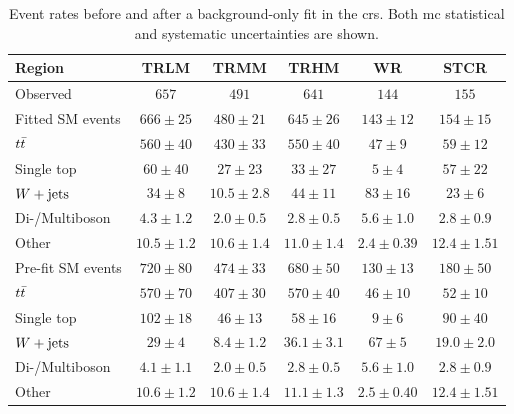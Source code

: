 \begin{table}
\begin{center}
{\small
\begin{tabular}{lccccc}
\toprule
Region           & TRLM            & TRMM            & TRHM            & WR            & STCR              \\[-0.05cm]
\midrule
Observed          & $657$              & $491$              & $641$              & $144$              & $155$                    \\
\midrule
Fitted SM events       & $666 \pm 25$          & $480 \pm 21$          & $645 \pm 26$          & $143 \pm 12$          & $154 \pm 15$              \\
\midrule
       $t\bar{t}$         & $560 \pm 40$          & $430 \pm 33$          & $550 \pm 40$          & $47 \pm 9$          & $59 \pm 12$              \\
       Single top         & $60 \pm 40$          & $27 \pm 23$          & $33 \pm 27$          & $5 \pm 4$          & $57 \pm 22$              \\
       $W+\mathrm{jets}$         & $34 \pm 8$          & $10.5 \pm 2.8$          & $44 \pm 11$          & $83 \pm 16$          & $23 \pm 6$              \\
       Di-/Multiboson         & $4.3 \pm 1.2$          & $2.0 \pm 0.5$          & $2.8 \pm 0.5$          & $5.6 \pm 1.0$          & $2.8 \pm 0.9$              \\
       Other        & $10.5 \pm 1.2$          & $10.6 \pm 1.4$          & $11.0 \pm 1.4$          & $2.4 \pm 0.39$          & $12.4 \pm 1.51$              \\
\toprule
Pre-fit SM events              & $720 \pm 80$          & $474 \pm 33$          & $680 \pm 50$          & $130 \pm 13$          & $180 \pm 50$              \\
\midrule
        $t\bar{t}$         & $570 \pm 70$          & $407 \pm 30$          & $570 \pm 40$          & $46 \pm 10$          & $52 \pm 10$              \\
        Single top         & $102 \pm 18$          & $46 \pm 13$          & $58 \pm 16$          & $9 \pm 6$          & $90 \pm 40$              \\
        $W+\mathrm{jets}$        & $29 \pm 4$          & $8.4 \pm 1.2$          & $36.1 \pm 3.1$          & $67 \pm 5$          & $19.0 \pm 2.0$              \\
        Di-/Multiboson         & $4.1 \pm 1.1$          & $2.0 \pm 0.5$          & $2.8 \pm 0.5$          & $5.6 \pm 1.0$          & $2.8 \pm 0.9$              \\
        Other         & $10.6 \pm 1.2$          & $10.6 \pm 1.4$          & $11.1 \pm 1.3$          & $2.5 \pm 0.40$          & $12.4 \pm 1.51$              \\
\bottomrule
\end{tabular}}
\end{center}
\caption{Event rates before and after a background-only fit in the \glspl{cr}. Both \gls{mc} statistical and systematic uncertainties are shown.}
\label{tab:results_bkg_only_CR}
\end{table}
%
